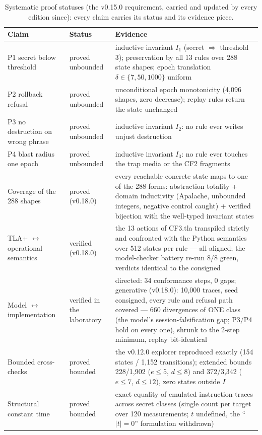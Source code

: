 \begin{table}[t]
\centering\small
\caption{Systematic proof statuses (the v0.15.0 requirement, carried and updated by every edition since): every claim carries its status and its evidence piece.}
\label{tab:statuts}
\begin{tabularx}{\textwidth}{lXX}
\toprule
Claim & Status & Evidence \\
\midrule
P1 secret below threshold & proved unbounded & inductive invariant $I_1$ (secret $\Rightarrow$ threshold 3); preservation by all 13 rules over 288 state shapes; epoch translation $\delta\in\{7,50,1000\}$ uniform \\
P2 rollback refusal & proved unbounded & unconditional epoch monotonicity (4{,}096 shapes, zero decrease); replay rules return the state unchanged \\
P3 no destruction on wrong phrase & proved unbounded & inductive invariant $I_2$: no rule ever writes unjust destruction \\
P4 blast radius one epoch & proved unbounded & inductive invariant $I_3$: no rule ever touches the trap media or the CF2 fragments \\
Coverage of the 288 shapes & proved (v0.18.0) & every reachable concrete state maps to one of the 288 forms: abstraction totality + domain inductivity (Apalache, unbounded integers, negative control caught) + verified bijection with the well-typed invariant states \\
TLA+ $\leftrightarrow$ operational semantics & verified (v0.18.0) & the 13 actions of CF3.tla transpiled strictly and confronted with the Python semantics over 512 states per rule --- all aligned; the model-checker battery re-run 8/8 green, verdicts identical to the consigned \\
Model $\leftrightarrow$ implementation & verified in the laboratory & directed: 34 conformance steps, 0 gaps; generative (v0.18.0): 10{,}000 traces, seed consigned, every rule and refusal path covered --- 660 divergences of ONE class (the model's session-falsification gap; P3/P4 hold on every one), shrunk to the 2-step minimum, replay bit-identical \\
Bounded cross-checks & proved bounded & the v0.12.0 explorer reproduced exactly (154 states / 1{,}152 transitions); extended bounds 228/1{,}902 ($e\le5$, $d\le8$) and 372/3{,}342 ($e\le7$, $d\le12$), zero states outside $I$ \\
Structural constant time & proved bounded & exact equality of emulated instruction traces across secret classes (single count per target over 120 measurements; $t$ undefined, the ``$|t|{=}0$'' formulation withdrawn) \\

\end{tabularx}
\end{table}
